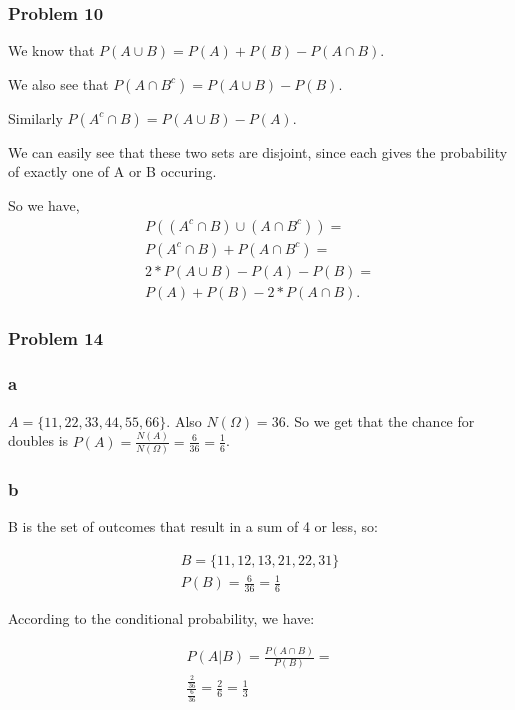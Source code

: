 \documentclass{article}
\begin{document}
\subsubsection*{Problem 10}

We know that $P(A \cup B) = P(A) + P(B) - P(A \cap B)$.

We also see that $P(A \cap B^{c}) = P(A \cup B) - P(B)$.

Similarly $P(A^{c} \cap B) = P(A \cup B) - P(A)$.

We can easily see that these two sets are disjoint, since each gives the probability of exactly one of A or B occuring.

So we have,
\begin{gather*}
    P((A^{c} \cap B) \cup (A \cap B^{c})) =\\
    P(A^{c} \cap B) + P(A \cap B^{c}) = \\
    2 * P(A \cup B) - P(A) - P(B) = \\
    P(A) + P(B) - 2 * P(A \cap B).
\end{gather*}

\subsubsection*{Problem 14}

\subsubsection*{a}

$A = \{11, 22, 33, 44, 55, 66\}$.
Also $N(\Omega) = 36$.
So we get that the chance for doubles is $P(A) = \frac{N(A)}{N(\Omega)} = \frac{6}{36} = \frac{1}{6}$.

\subsubsection*{b}

B is the set of outcomes that result in a sum of 4 or less, so:

\begin{gather*}
    B = \{11, 12, 13, 21, 22, 31\} \\
    P(B) = \frac{6}{36} = \frac{1}{6}
\end{gather*}

According to the conditional probability, we have:

\begin{gather*}
    P(A|B) = \frac{P(A \cap B)}{P(B)} = \\
    \frac{\frac{2}{36}}{\frac{6}{36}} = \frac{2}{6} = \frac{1}{3}
\end{gather*}
\end{document}
